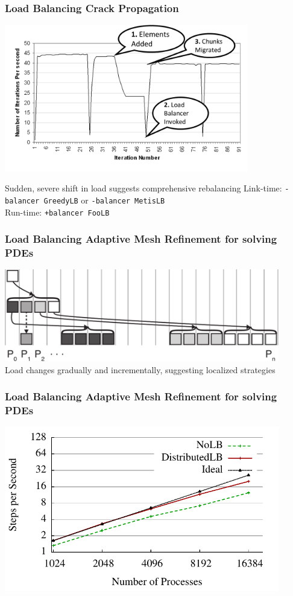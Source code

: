 \begin{frame}[fragile]
\frametitle{Load Balancing Crack Propagation}
\begin{centering}
\includegraphics[width=0.8\textwidth]{../figures/LButilizationCrackPropWithAnnotation}
\end{centering}
\begin{block}{Sudden, severe shift in load suggests comprehensive rebalancing}
Link-time: \texttt{-balancer GreedyLB} or \texttt{-balancer MetisLB} \\
Run-time: \texttt{+balancer FooLB}
\end{block}
\end{frame}


\begin{frame}
\frametitle{Load Balancing Adaptive Mesh Refinement for solving PDEs}
\includegraphics[width=0.9\textwidth]{../figures/amr_mapping.pdf}\\
Load changes gradually and incrementally, suggesting localized strategies
\end{frame}


\begin{frame}
\frametitle{Load Balancing Adaptive Mesh Refinement for solving PDEs}
\includegraphics[width=0.9\textwidth]{../figures/amr_scaling_distlb.pdf}
\end{frame}

